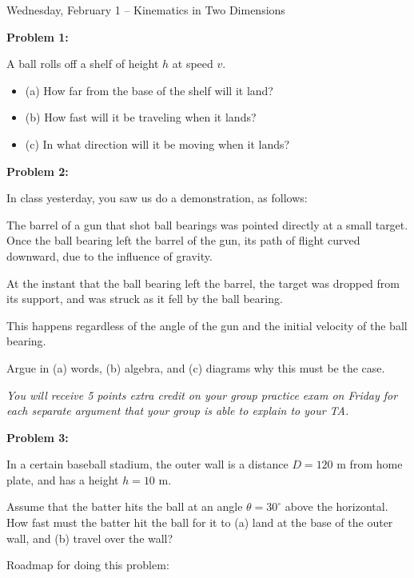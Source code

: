 \documentclass[12pt]{article}
\newcommand{\BC}{\begin{center}}
\newcommand{\EC}{\end{center}}
\begin{document}
\Large
\centerline{}
\large
\BC
\sc
Wednesday, February 1 -- Kinematics in Two Dimensions
\EC
\normalsize

{\large \bf Problem 1:}

A ball rolls off a shelf of height $h$ at speed $v$. 

\begin{itemize} 
\item (a) How far from the base of the 
shelf will it land?
\item (b) How fast will it be traveling when it lands?
\item (c) In what direction will it be moving when it lands?
\end{itemize}

{\large \bf Problem 2:}

In class yesterday, you saw us do a demonstration, as follows:

The barrel of a gun that shot ball bearings was pointed directly at a small target.
Once the ball bearing left the barrel of the gun, its path of flight curved 
downward, due to the influence of gravity. 

At the instant that the ball bearing left the barrel, the target was dropped from its
support, and was struck as it fell by the ball bearing.

This happens regardless of the angle of the gun and the initial velocity of the ball bearing.

Argue in (a) words, (b) algebra, and (c) diagrams why this must be the case.

{\it You will receive 5 points extra credit on your group practice exam on Friday
for each separate argument that your group is able to explain to your TA.}

\newpage

{\large \bf Problem 3:}

\bigskip

In a certain baseball stadium, the outer wall is a distance $D=120$ m from 
home plate, and has a height $h=10$ m.

Assume that the batter hits the ball at an angle $\theta=30^\circ$ above the
horizontal. How fast must the batter hit the ball for it to (a) land at the base
of the outer wall, and (b) travel over the wall?

Roadmap for doing this problem:
\end{document}
